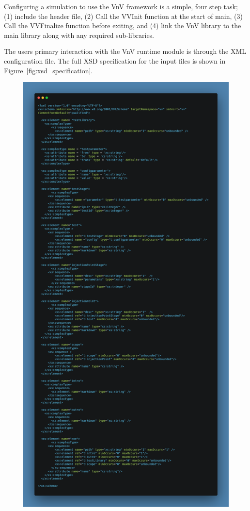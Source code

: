 Configuring a simulation to use the VnV framework is a simple, four step task; (1) include the header file, (2) Call the VVInit function at the start of main, (3) Call the VVFinalize function
before exiting, and (4) link the VnV library to the main library along with any required sub-libraries. 

The users primary interaction with the VnV runtime module is through the XML configuration file. The full XSD specification for the input 
files is shown in Figure~\ref{fig:xsd_specification}. 

\begin{figure}
\centering
 \includegraphics[height=0.9\textheight, width=\textwidth, keepaspectratio]{./Figures/xsd-schema.png}

\end{figure}
